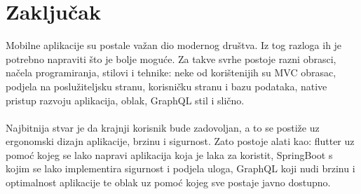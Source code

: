 \documentclass[times, utf8, zavrsni]{fer}
\begin{document}
\chapter{Zaključak}
Mobilne aplikacije su postale važan dio modernog društva. Iz tog razloga ih je potrebno napraviti što je
bolje moguće. Za takve svrhe postoje razni obrasci, načela programiranja, stilovi i tehnike: neke od
korištenijih su MVC obrasac, podjela na poslužiteljsku stranu, korisničku stranu i bazu podataka,
native pristup razvoju aplikacija, oblak, GraphQL stil i slično.
\\\\
Najbitnija stvar je da krajnji korisnik bude zadovoljan, a to se postiže uz ergonomski dizajn aplikacije,
brzinu i sigurnost. Zato postoje alati kao: flutter uz pomoć kojeg se lako napravi aplikacija koja
je laka za koristit, SpringBoot s kojim se lako implementira sigurnost i podjela uloga,  GraphQL koji
nudi brzinu i optimalnost aplikacije te oblak uz pomoć kojeg sve postaje javno dostupno.



\end{document}
